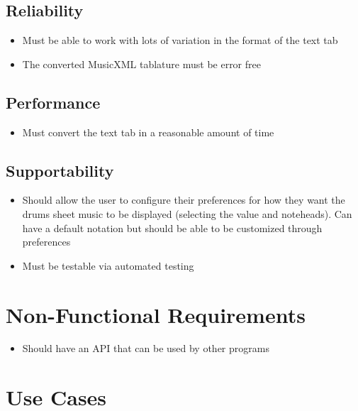 \documentclass[11pt]{article}
\begin{document}
\subsection{Reliability}
\label{sec:orgf91aaa9}
\begin{itemize}
\item Must be able to work with lots of variation in the format of the text tab
\item The converted MusicXML tablature must be error free
\end{itemize}

\subsection{Performance}
\label{sec:org66ae1c1}
\begin{itemize}
\item Must convert the text tab in a reasonable amount of time
\end{itemize}

\subsection{Supportability}
\label{sec:orgd8989a2}
\begin{itemize}
\item Should allow the user to configure their preferences for how they want the drums sheet music to be displayed (selecting the value and noteheads). Can have a default notation but should be able to be customized through preferences
\item Must be testable via automated testing
\end{itemize}

\section{Non-Functional Requirements}
\label{sec:org9349e92}
\begin{itemize}
\item Should have an API that can be used by other programs
\end{itemize}

\section{Use Cases}
\label{sec:org64a1f7c}
\end{document}
